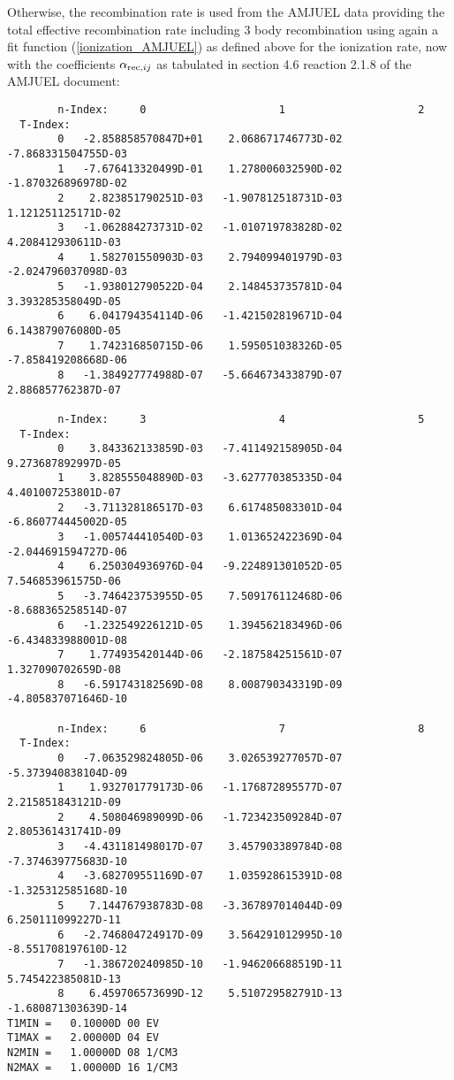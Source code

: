 \documentclass[amsmath,amssymb,a4]{revtex4-2}
\begin{document}
Otherwise, the recombination rate is used from the AMJUEL data providing the total effective recombination rate including 3 body recombination using again a fit function (\ref{ionization_AMJUEL}) as defined above for the ionization rate, now with the coefficients $\alpha_{{\rm rec,} ij}$ as tabulated in section 4.6 reaction 2.1.8 of the AMJUEL document:
\begin{small}\begin{verbatim}
        n-Index:     0                     1                     2
  T-Index:
        0   -2.858858570847D+01    2.068671746773D-02   -7.868331504755D-03
        1   -7.676413320499D-01    1.278006032590D-02   -1.870326896978D-02
        2    2.823851790251D-03   -1.907812518731D-03    1.121251125171D-02
        3   -1.062884273731D-02   -1.010719783828D-02    4.208412930611D-03
        4    1.582701550903D-03    2.794099401979D-03   -2.024796037098D-03
        5   -1.938012790522D-04    2.148453735781D-04    3.393285358049D-05
        6    6.041794354114D-06   -1.421502819671D-04    6.143879076080D-05
        7    1.742316850715D-06    1.595051038326D-05   -7.858419208668D-06
        8   -1.384927774988D-07   -5.664673433879D-07    2.886857762387D-07

        n-Index:     3                     4                     5
  T-Index:
        0    3.843362133859D-03   -7.411492158905D-04    9.273687892997D-05
        1    3.828555048890D-03   -3.627770385335D-04    4.401007253801D-07
        2   -3.711328186517D-03    6.617485083301D-04   -6.860774445002D-05
        3   -1.005744410540D-03    1.013652422369D-04   -2.044691594727D-06
        4    6.250304936976D-04   -9.224891301052D-05    7.546853961575D-06
        5   -3.746423753955D-05    7.509176112468D-06   -8.688365258514D-07
        6   -1.232549226121D-05    1.394562183496D-06   -6.434833988001D-08
        7    1.774935420144D-06   -2.187584251561D-07    1.327090702659D-08
        8   -6.591743182569D-08    8.008790343319D-09   -4.805837071646D-10

        n-Index:     6                     7                     8
  T-Index:
        0   -7.063529824805D-06    3.026539277057D-07   -5.373940838104D-09
        1    1.932701779173D-06   -1.176872895577D-07    2.215851843121D-09
        2    4.508046989099D-06   -1.723423509284D-07    2.805361431741D-09
        3   -4.431181498017D-07    3.457903389784D-08   -7.374639775683D-10
        4   -3.682709551169D-07    1.035928615391D-08   -1.325312585168D-10
        5    7.144767938783D-08   -3.367897014044D-09    6.250111099227D-11
        6   -2.746804724917D-09    3.564291012995D-10   -8.551708197610D-12
        7   -1.386720240985D-10   -1.946206688519D-11    5.745422385081D-13
        8    6.459706573699D-12    5.510729582791D-13   -1.680871303639D-14
T1MIN =   0.10000D 00 EV
T1MAX =   2.00000D 04 EV
N2MIN =   1.00000D 08 1/CM3
N2MAX =   1.00000D 16 1/CM3
\end{verbatim}\end{small}
\end{document}
